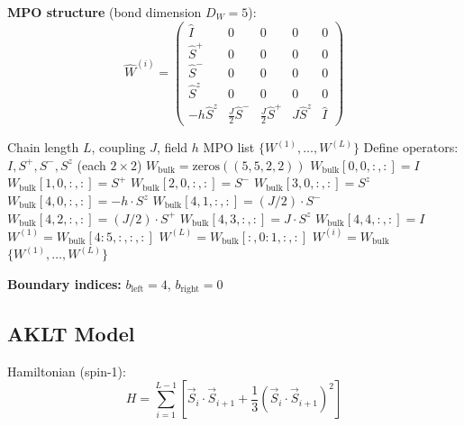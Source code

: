 \documentclass[aps,prb,onecolumn,scriptaddress]{revtex4-2}
\begin{document}
	\textbf{MPO structure} (bond dimension $D_W = 5$):
	\begin{equation}
		\hat{W}^{(i)} = \begin{pmatrix}
			\hat{I} & 0 & 0 & 0 & 0 \\
			\hat{S}^+ & 0 & 0 & 0 & 0 \\
			\hat{S}^- & 0 & 0 & 0 & 0 \\
			\hat{S}^z & 0 & 0 & 0 & 0 \\
			-h\hat{S}^z & \frac{J}{2}\hat{S}^- & \frac{J}{2}\hat{S}^+ & J\hat{S}^z & \hat{I}
		\end{pmatrix}
	\end{equation}
	
	\begin{algorithm}[H]
		\caption{BuildHeisenbergMPO}
		\begin{algorithmic}[1]
			\Require Chain length $L$, coupling $J$, field $h$
			\Ensure MPO list $\{W^{(1)}, \ldots, W^{(L)}\}$
			\State Define operators: $I, S^+, S^-, S^z$ (each $2 \times 2$)
			\State {}
			\State $W_{\text{bulk}} = \text{zeros}((5, 5, 2, 2))$
			\State $W_{\text{bulk}}[0, 0, :, :] = I$
			\State $W_{\text{bulk}}[1, 0, :, :] = S^+$
			\State $W_{\text{bulk}}[2, 0, :, :] = S^-$
			\State $W_{\text{bulk}}[3, 0, :, :] = S^z$
			\State $W_{\text{bulk}}[4, 0, :, :] = -h \cdot S^z$
			\State $W_{\text{bulk}}[4, 1, :, :] = (J/2) \cdot S^-$
			\State $W_{\text{bulk}}[4, 2, :, :] = (J/2) \cdot S^+$
			\State $W_{\text{bulk}}[4, 3, :, :] = J \cdot S^z$
			\State $W_{\text{bulk}}[4, 4, :, :] = I$
			\State {}
			\State $W^{(1)} = W_{\text{bulk}}[4:5, :, :, :]$ 
			\State $W^{(L)} = W_{\text{bulk}}[:, 0:1, :, :]$ 
			\State $W^{(i)} = W_{\text{bulk}}$ 
			\EndFor
			\State \Return $\{W^{(1)}, \ldots, W^{(L)}\}$
		\end{algorithmic}
	\end{algorithm}
	
	\textbf{Boundary indices:} $b_{\text{left}} = 4$, $b_{\text{right}} = 0$
	
	\subsection{AKLT Model}
	
	Hamiltonian (spin-1):
	\begin{equation}
		H = \sum_{i=1}^{L-1} \left[\vec{S}_i \cdot \vec{S}_{i+1} + \frac{1}{3}(\vec{S}_i \cdot \vec{S}_{i+1})^2\right]
	\end{equation}
	
\end{document}
